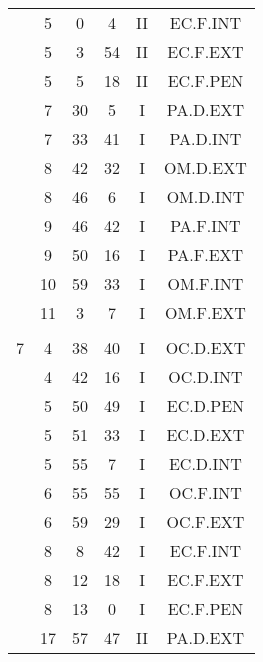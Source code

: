 \documentclass[12pt, a4paper]{article}
\begin{document}
\begin{multicols}{3}
{\begin{tabular}{c c c c c c}
	 	 	 	 & 5 & 0 & 4 & II & EC.F.INT\\%
	 	 	 	 & 5 & 3 & 54 & II & EC.F.EXT\\%
	 	 	 	 & 5 & 5 & 18 & II & EC.F.PEN\\%
	 	 	 	 & 7 & 30 & 5 & I & PA.D.EXT\\%
	 	 	 	 & 7 & 33 & 41 & I & PA.D.INT\\%
	 	 	 	 & 8 & 42 & 32 & I & OM.D.EXT\\%
	 	 	 	 & 8 & 46 & 6 & I & OM.D.INT\\%
	 	 	 	 & 9 & 46 & 42 & I & PA.F.INT\\%
	 	 	 	 & 9 & 50 & 16 & I & PA.F.EXT\\%
	 	 	 	 & 10 & 59 & 33 & I & OM.F.INT\\%
	 	 	 	 & 11 & 3 & 7 & I & OM.F.EXT\\%
	 	 	 	 & & & & & \\%
	 	 	 	7 & 4 & 38 & 40 & I & OC.D.EXT\\%
	 	 	 	 & 4 & 42 & 16 & I & OC.D.INT\\%
	 	 	 	 & 5 & 50 & 49 & I & EC.D.PEN\\%
	 	 	 	 & 5 & 51 & 33 & I & EC.D.EXT\\%
	 	 	 	 & 5 & 55 & 7 & I & EC.D.INT\\%
	 	 	 	 & 6 & 55 & 55 & I & OC.F.INT\\%
	 	 	 	 & 6 & 59 & 29 & I & OC.F.EXT\\%
	 	 	 	 & 8 & 8 & 42 & I & EC.F.INT\\%
	 	 	 	 & 8 & 12 & 18 & I & EC.F.EXT\\%
	 	 	 	 & 8 & 13 & 0 & I & EC.F.PEN\\%
	 	 	 	 & 17 & 57 & 47 & II & PA.D.EXT\\%

\end{tabular}}
\end{multicols}
\end{document}
